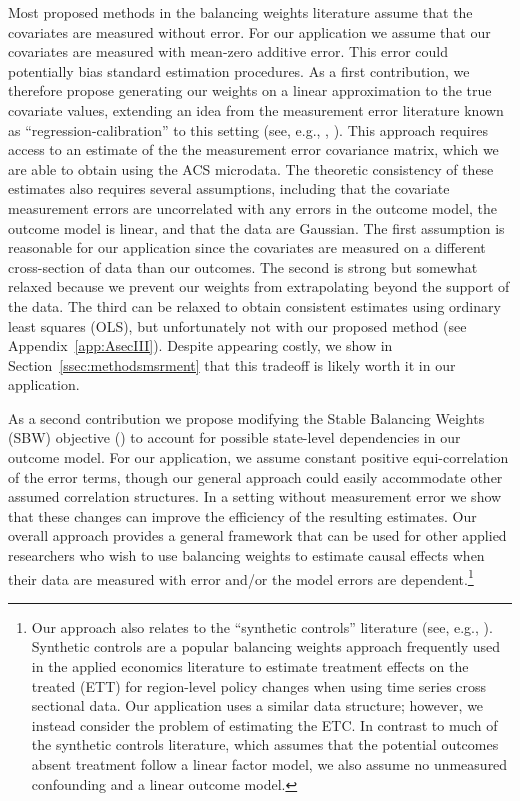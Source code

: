 \documentclass[aoas]{imsart}
\theoremstyle{plain}
\theoremstyle{remark}
\begin{document}
Most proposed methods in the balancing weights literature assume that the covariates are measured without error. For our application we assume that our covariates are measured with mean-zero additive error. This error could potentially bias standard estimation procedures. As a first contribution, we therefore propose generating our weights on a linear approximation to the true covariate values, extending an idea from the measurement error literature known as ``regression-calibration'' to this setting (see, e.g., \cite{carroll2006measurement}, \cite{gleser1992importance}). This approach requires access to an estimate of the the measurement error covariance matrix, which we are able to obtain using the ACS microdata. The theoretic consistency of these estimates also requires several assumptions, including that the covariate measurement errors are uncorrelated with any errors in the outcome model, the outcome model is linear, and that the data are Gaussian. The first assumption is reasonable for our application since the covariates are measured on a different cross-section of data than our outcomes. The second is strong but somewhat relaxed because we prevent our weights from extrapolating beyond the support of the data. The third can be relaxed to obtain consistent estimates using ordinary least squares (OLS), but unfortunately not with our proposed method (see Appendix~\ref{app:AsecIII}). Despite appearing costly, we show in Section~\ref{ssec:methodsmsrment} that this tradeoff is likely worth it in our application.

As a second contribution we propose modifying the Stable Balancing Weights (SBW) objective (\cite{zubizarreta2015stable}) to account for possible state-level dependencies in our outcome model. For our application, we assume constant positive equi-correlation of the error terms, though our general approach could easily accommodate other assumed correlation structures. In a setting without measurement error we show that these changes can improve the efficiency of the resulting estimates. Our overall approach provides a general framework that can be used for other applied researchers who wish to use balancing weights to estimate causal effects when their data are measured with error and/or the model errors are dependent.\footnote{Our approach also relates to the ``synthetic controls'' literature (see, e.g., \cite{abadie2010synthetic}). Synthetic controls are a popular balancing weights approach frequently used in the applied economics literature to estimate treatment effects on the treated (ETT) for region-level policy changes when using time series cross sectional data. Our application uses a similar data structure; however, we instead consider the problem of estimating the ETC. In contrast to much of the synthetic controls literature, which assumes that the potential outcomes absent treatment follow a linear factor model, we also assume no unmeasured confounding and a linear outcome model.}
\end{document}
